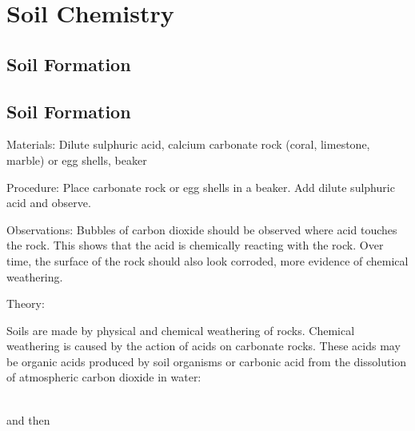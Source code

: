 \section{Soil Chemistry}

\begin{multicols}{2}


\section*{Soil Formation}


\subsection{Soil Formation}


\begin{description*}
\item[Materials:]{Dilute sulphuric acid, calcium carbonate rock (coral, limestone, marble) or egg shells, beaker}
\item[Procedure:]{Place carbonate rock or egg shells in a beaker. Add dilute sulphuric acid and observe.}
\item[Observations:]{Bubbles of carbon dioxide should be observed where acid touches the rock. This shows that the acid is chemically reacting with the rock. Over time, the surface of the rock should also look corroded, more evidence of chemical weathering.}
\item[Theory:]{
\raggedright Soils are made by physical and chemical weathering of rocks. Chemical weathering is caused by the action of acids on carbonate rocks. These acids may be organic acids produced by soil organisms or carbonic acid from the dissolution of atmospheric carbon dioxide in water:\\

\centering
{}\\
\raggedright

and then\\

\\
\raggedright

}
\end{description*}
\end{multicols}
